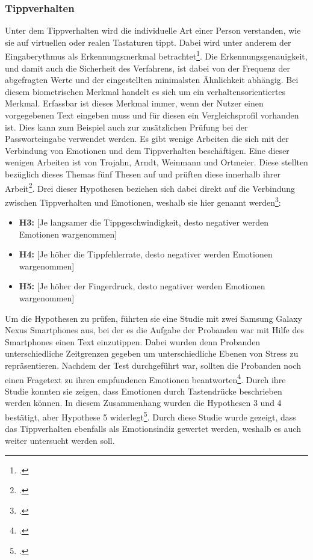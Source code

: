 \subsubsection{Tippverhalten}
Unter dem Tippverhalten wird die individuelle Art einer Person verstanden, wie sie auf virtuellen oder realen Tastaturen tippt. Dabei wird unter anderem der Eingaberythmus als Erkennungsmerkmal betrachtet\footcite[Vgl. ][Allgemein Abs. 1]{Bio18b}. Die Erkennungsgenauigkeit, und damit auch die Sicherheit des Verfahrens, ist dabei von der Frequenz der abgefragten Werte und der eingestellten minimalsten Ähnlichkeit abhängig. Bei diesem biometrischen Merkmal handelt es sich um ein verhaltensorientiertes Merkmal. Erfassbar ist dieses Merkmal immer, wenn der Nutzer einen vorgegebenen Text eingeben muss und für diesen ein Vergleichsprofil vorhanden ist. Dies kann zum Beispiel auch zur zusätzlichen Prüfung bei der Passworteingabe verwendet werden.\newline
Es gibt wenige Arbeiten die sich mit der Verbindung von Emotionen und dem Tippverhalten beschäftigen. Eine dieser wenigen Arbeiten ist von Trojahn, Arndt, Weinmann und Ortmeier. Diese stellten bezüglich dieses Themas fünf Thesen auf und prüften diese innerhalb ihrer Arbeit\footcite[Vgl. ][S.32 2.3 Hypotheses]{Tro13}. Drei dieser Hypothesen beziehen sich dabei direkt auf die Verbindung zwischen Tippverhalten und Emotionen, weshalb sie hier genannt werden\footcite[siehe ][S.33 Z.8-13]{Tro13}:
\begin{itemize}
	\item \textbf{H3:} [Je langsamer die Tippgeschwindigkeit, desto negativer werden Emotionen wargenommen]
	\item \textbf{H4:} [Je höher die Tippfehlerrate, desto negativer werden Emotionen wargenommen]
	\item \textbf{H5:} [Je höher der Fingerdruck, desto negativer werden Emotionen wargenommen]
\end{itemize}
Um die Hypothesen zu prüfen, führten sie eine Studie mit zwei Samsung Galaxy Nexus Smartphones aus, bei der es die Aufgabe der Probanden war mit Hilfe des Smartphones einen Text einzutippen. Dabei wurden denn Probanden unterschiedliche Zeitgrenzen gegeben um unterschiedliche Ebenen von Stress zu repräsentieren. Nachdem der Test durchgeführt war, sollten die Probanden noch einen Fragetext zu ihren empfundenen Emotionen beantworten\footcite[Vgl. ][S.33 3.1 Study Object and Study Task]{Tro13}. Durch ihre Studie konnten sie zeigen, dass Emotionen durch Tastendrücke beschrieben werden können. In diesem Zusammenhang wurden die Hypothesen 3 und 4 bestätigt, aber Hypothese 5 widerlegt\footcite[Vgl. ][S.35 5.1 Summary]{Tro13}.\newline
Durch diese Studie wurde gezeigt, dass das Tippverhalten ebenfalls als Emotionsindiz gewertet werden, weshalb es auch weiter untersucht werden soll.
